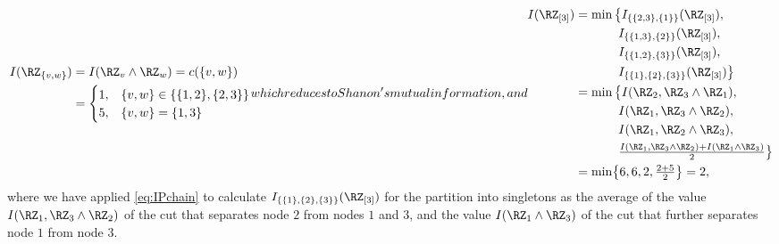 \documentclass[conference,letterpaper]{IEEEtran}
\begin{document}
\begin{subequations}
\label{eq:eg:I}
\begin{align}
\label{eq:eg:I2}
\begin{split}
	I(\RZ_{\Set{v,w}})&=I(\RZ_v\wedge \RZ_w)=c(\Set {v,w})\\
	&= \begin{cases}
		1, & \Set{v,w}\in \Set{\Set{1,2},\Set {2,3}}\\
		5, &  \Set{v,w}=\Set{1,3}
	\end{cases}
\end{split}
\end{align}
which reduces to Shanon's mutual information, and
\begin{align}
\label{eq:eg:I3}
\begin{split}
	I(\RZ_{[3]}) &=\min
	\big\{ I_{\Set{\Set{2,3},\Set{1}}}(\RZ_{[3]}),\\
	&\kern3.5em I_{\Set{\Set{1,3},\Set{2}}}(\RZ_{[3]}),\\
	&\kern3.5emI_{\Set{\Set{1,2},\Set{3}}}(\RZ_{[3]}),\\
	&\kern3.5emI_{\Set{\Set{1},\Set{2},\Set{3}}}(\RZ_{[3]})\big\}\\
	&=\min
	\big\{ I(\RZ_2,\RZ_3\wedge \RZ_1),\\
	&\kern3.5em I(\RZ_1,\RZ_3\wedge \RZ_2),\\
	&\kern3.5em I(\RZ_1,\RZ_2\wedge \RZ_3),\\
	&\kern3.5em \tfrac{I(\RZ_1,\RZ_3\wedge \RZ_2)+I(\RZ_1\wedge \RZ_3)}2\big\}\\
	&=\min \Set*{6,6,2,\tfrac{2+5}2} = 2,
\end{split}
\end{align}
\end{subequations}
where we have applied \eqref{eq:IPchain} to calculate $I_{\Set{\Set{1},\Set{2},\Set{3}}}(\RZ_{[3]})$ for the partition into singletons as the average of the value $I(\RZ_1,\RZ_3\wedge \RZ_2)$ of the cut that separates node $2$ from nodes $1$ and $3$, and the value $I(\RZ_1\wedge \RZ_3)$ of the cut that further separates node $1$ from node $3$. 
\end{document}
